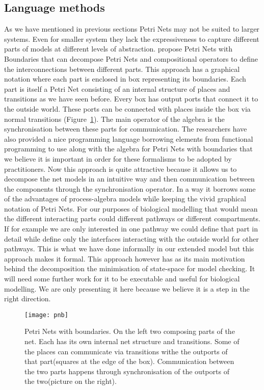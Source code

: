 \subsection{Language methods}
As we have mentioned in previous sections Petri Nets may not be suited
to larger systems. Even for smaller system they lack the
expressiveness to capture different parts of models at different
levels of abstraction. \citet{DBLP:journals/corr/abs-1304-3121} propose Petri Nets with
Boundaries that can decompose Petri Nets and compositional operators
to define the interconnections between different parts. This approach
has a graphical notation where each part is enclosed in box
representing its boundaries. Each part is itself a Petri Net
consisting of an internal structure of places and transitions as we
have seen before. Every box has output ports that connect it to the
outside world. These ports can be connected with places inside the box
via normal transitions (Figure~\ref{fig:pnb}). The main operator of the algebra is the
synchronisation between these parts for communication. The researchers
have also provided a nice programming language borrowing elements from
functional programming to use along with the
algebra for Petri Nets with boundaries that we believe it is important
in order for these formalisms to be adopted by practitioners. Now this
approach is quite attractive because it allows us to decompose the net
models in an intuitive way and then communication between the
components through the synchronisation operator. In a way it borrows
some of the advantages of process-algebra models while keeping the
vivid graphical notation of Petri Nets. For our purposes of biological
modelling that would mean the different interacting parts could
different pathways or different compartments. If for example we are
only interested in one pathway we could define that part in detail
while define only the interfaces interacting with the outside world
for other pathways. This is what we have done informally in our
extended model but this approach makes it formal. This approach
however has as its main motivation behind the decomposition the
minimisation of state-space for model checking. It will need some
further work for it to be executable and useful for biological
modelling. We are only presenting it here because we believe it is a step
in the right direction.

\begin{figure}[htbp!]
\centering
\texttt{[image: pnb]}
\caption[Petri Nets with boundaries]{Petri Nets with boundaries. On
  the left two composing parts of the net. Each has its own internal
  net structure and transitions. Some of the places can communicate
  via transitions withe the outports of that part(squares at the edge
  of the box). Communication between the two parts happens through
  synchronisation of the outports of the two(picture on the right).}
\label{fig:pnb}
\end{figure}

